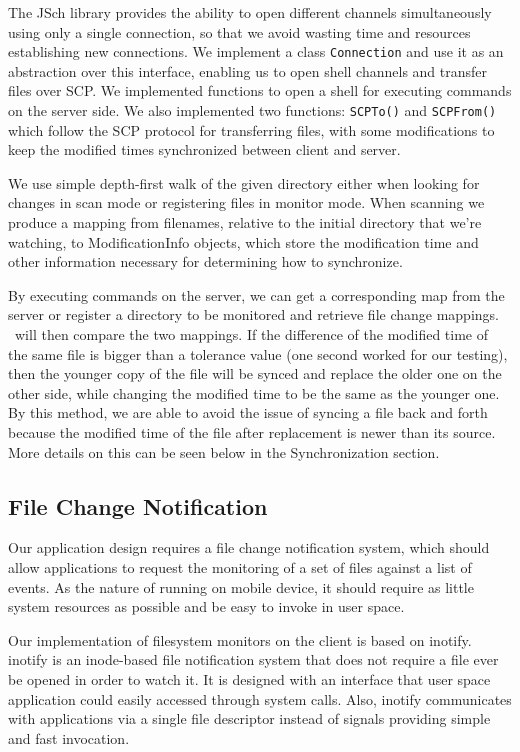 The JSch library provides the ability to open different channels simultaneously using only a single connection, so that we avoid 
wasting time and resources establishing new connections. We implement a class \verb+Connection+ and use it as an abstraction over this interface, enabling us to open shell channels and transfer files over SCP. We implemented functions to open 
a shell for executing commands on the server side.  
We also implemented two functions: \verb+SCPTo()+ and \verb+SCPFrom()+ which follow the SCP protocol for transferring files, with some modifications to keep the modified times synchronized between client and server. 

We use simple depth-first walk of the given directory either when looking for changes in scan mode or registering files in monitor mode. When scanning we produce a mapping from filenames, relative to the initial directory that we're watching, to ModificationInfo objects, which store the modification time and other information necessary for determining how to synchronize.

By executing commands on the server, we can get a corresponding map from the server or register a directory to be monitored  and retrieve file change mappings. \teledroid\ will then compare the two mappings. If the difference of the modified time of the same file is bigger than a tolerance value (one second worked for our testing), then the younger copy of the file will be synced and replace the older one on the other side, while changing the modified time to be the same as the younger one. By this method, we are able to avoid the issue of syncing a file back and forth because the modified time of the file after replacement is newer than its source. More details on this can be seen below in the Synchronization section.

\subsection{File Change Notification}
Our application design requires a file change notification system, which should allow applications to request 
the monitoring of a set of files against a list of events. As the nature of running on mobile device, it should 
require as little system resources as possible and be easy to invoke in user space. 

Our implementation of filesystem monitors on the client is based on inotify. inotify is an inode-based file notification system 
that does not require a file ever be opened in order to watch it. It is designed with an interface that user space 
application could easily accessed through system calls. Also, inotify communicates with applications via a single 
file descriptor instead of signals providing simple and fast invocation.

